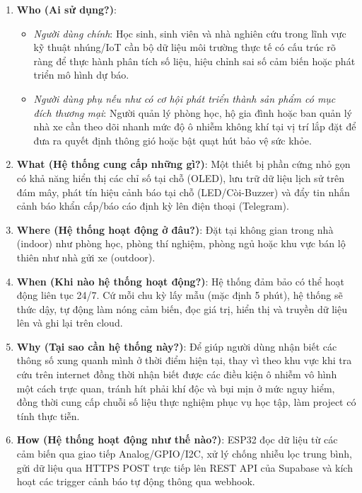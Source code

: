 \begin{enumerate}
    \item \textbf{Who (Ai sử dụng?)}: 
    \begin{itemize}
        \item \textit{Người dùng chính}: Học sinh, sinh viên và nhà nghiên cứu trong lĩnh vực kỹ thuật nhúng/IoT cần bộ dữ liệu môi trường thực tế có cấu trúc rõ ràng để thực hành phân tích số liệu, hiệu chỉnh sai số cảm biến hoặc phát triển mô hình dự báo.
        \item \textit{Người dùng phụ nếu như có cơ hội phát triển thành sản phẩm có mục đích thương mại}: Người quản lý phòng học, hộ gia đình hoặc ban quản lý nhà xe cần theo dõi nhanh mức độ ô nhiễm không khí tại vị trí lắp đặt để đưa ra quyết định thông gió hoặc bật quạt hút bảo vệ sức khỏe.
    \end{itemize}
    \item \textbf{What (Hệ thống cung cấp những gì?)}: Một thiết bị phần cứng nhỏ gọn có khả năng hiển thị các chỉ số tại chỗ (OLED), lưu trữ dữ liệu lịch sử trên đám mây, phát tín hiệu cảnh báo tại chỗ (LED/Còi-Buzzer) và đẩy tin nhắn cảnh báo khẩn cấp/báo cáo định kỳ lên điện thoại (Telegram).
    \item \textbf{Where (Hệ thống hoạt động ở đâu?)}: Đặt tại không gian trong nhà (indoor) như phòng học, phòng thí nghiệm, phòng ngủ hoặc khu vực bán lộ thiên như nhà gửi xe (outdoor).
    \item \textbf{When (Khi nào hệ thống hoạt động?)}: Hệ thống đảm bảo có thể hoạt động liên tục 24/7. Cứ mỗi chu kỳ lấy mẫu (mặc định 5 phút), hệ thống sẽ thức dậy, tự động làm nóng cảm biến, đọc giá trị, hiển thị và truyền dữ liệu lên và ghi lại trên cloud.
    \item \textbf{Why (Tại sao cần hệ thống này?)}: Để giúp người dùng nhận biết các thông số xung quanh mình ở thời điểm hiện tại, thay vì theo khu vực khi tra cứu trên internet đồng thời nhận biết được các điều kiện ô nhiễm vô hình một cách trực quan, tránh hít phải khí độc và bụi mịn ở mức nguy hiểm, đồng thời cung cấp chuỗi số liệu thực nghiệm phục vụ học tập, làm project có tính thực tiễn.
    \item \textbf{How (Hệ thống hoạt động như thế nào?)}: ESP32 đọc dữ liệu từ các cảm biến qua giao tiếp Analog/GPIO/I2C, xử lý chống nhiễu lọc trung bình, gửi dữ liệu qua HTTPS POST trực tiếp lên REST API của Supabase và kích hoạt các trigger cảnh báo tự động thông qua webhook.
\end{enumerate}

